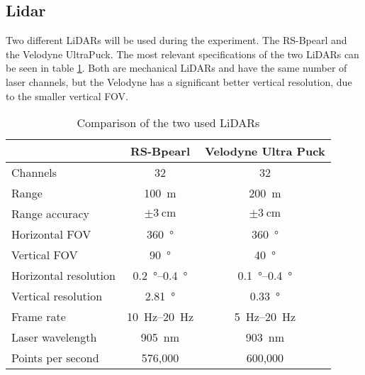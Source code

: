 \subsection{Lidar}
Two different LiDARs will be used during the experiment.
The RS-Bpearl and the Velodyne UltraPuck.
The most relevant specifications of the two LiDARs can be seen in table \ref{tab:lidar_datasheets}.
Both are mechanical LiDARs and have the same number of laser channels, but the Velodyne has a significant better vertical resolution, due to the smaller vertical FOV.
\begin{table}[ht]
	\centering
	\caption{Comparison of the two used LiDARs \cite{RoboSense2020}\cite{Rev}}
	\label{tab:lidar_datasheets}
	\begin{tabular}[t]{lcc}
	\toprule
	&\textbf{RS-Bpearl} & \textbf{Velodyne Ultra Puck}\\
	\midrule
	Channels 				& 32 							& 32\\
	Range 					& \SI{100}{\metre}				& \SI{200}{\metre}\\
	Range accuracy			& $\pm\SI{3}{\centi\metre}$		& $\pm\SI{3}{\centi\metre}$\\
	Horizontal FOV		 	& \SI{360}{\degree}				& \SI{360}{\degree}\\
	Vertical FOV 			& \SI{90}{\degree}				& \SI{40}{\degree}\\
	Horizontal resolution	& \SIrange{0.2}{0.4}{\degree} 	& \SIrange{0.1}{0.4}{\degree}\\
	Vertical resolution		& \SI{2.81}{\degree} 			& \SI{0.33}{\degree}\\
	Frame rate 				& \SIrange{10}{20}{\hertz}		& \SIrange{5}{20}{\hertz}\\
	Laser wavelength 		& \SI{905}{\nano\metre} 		& \SI{903}{\nano\metre}\\
	Points per second 		& 576,000						& 600,000		\\
	\bottomrule
	\end{tabular}
	\end{table}%



